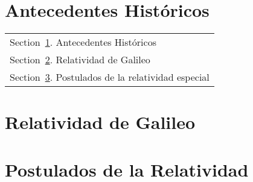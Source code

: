 \documentclass[../main]{subfiles}
\begin{document}
\section{Antecedentes Históricos}\label{sec:antecedentes}
        \begin{margintable}\vspace{.8in}\footnotesize
		\begin{tabularx}{\marginparwidth}{|X}
		Section~\ref{sec:antecedentes}. Antecedentes Históricos\\
        Section~\ref{sec:galileo}. Relatividad de Galileo\\
        Section~\ref{sec:postulados}. Postulados de la relatividad especial
		\end{tabularx}
	\end{margintable}
 
        \lipsum[1]

        \section{Relatividad de Galileo}\label{sec:galileo}
        \begin{fullpage}
            \lipsum[1]
        \end{fullpage}

        \section{Postulados de la Relatividad}\label{sec:postulados}
        \begin{fullpage}
            \lipsum[1]
        \end{fullpage}
\end{document}
